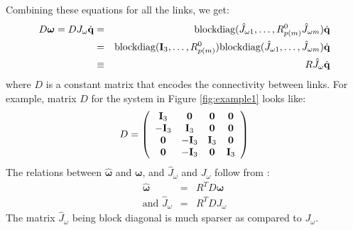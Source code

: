 Combining these equations for all the links, we get:
\begin{eqnarray}
\label{eq:jacsplit}
\nonumber
D \bm{\omega} = D J_{\omega} \dot{\mathbf{q}} & = & \mbox{blockdiag}(\hat{J}_{\omega 1},\hdots,R^0_{p(m)}\hat{J}_{\omega m})\dot{\mathbf{q}}\\
\nonumber
& = & \mbox{blockdiag}(\mathbf{I}_3,\hdots,R^0_{p(m)})\mbox{blockdiag}(\hat{J}_{\omega 1},\hdots,\hat{J}_{\omega m})\dot{\mathbf{q}}\\
& \equiv & R \hat{J}_{\omega}\dot{\mathbf{q}}
\end{eqnarray}
where $D$ is a constant matrix that encodes the connectivity between links. For example, matrix $D$ for the system in Figure \ref{fig:example1} looks
like:
\begin{equation}
D =
\left (
\begin{array}{cccc}
\mathbf{I}_{3}  & \mathbf{0} & \mathbf{0} & \mathbf{0}\\
-\mathbf{I}_{3} & \mathbf{I}_{3}  & \mathbf{0} & \mathbf{0}\\
\mathbf{0} & -\mathbf{I}_{3} & \mathbf{I}_{3}  & \mathbf{0}\\
\mathbf{0} & -\mathbf{I}_{3} & \mathbf{0} & \mathbf{I}_{3}\\
\end{array}
\right )  
\end{equation}
The relations between $\hat{\bm{\omega}}$ and $\bm{\omega}$, and $\hat{J}_{\omega}$ and $J_{\omega}$ follow from :
\begin{eqnarray}
\label{eq:jacbodyhat}
\nonumber
\hat{\bm{\omega}} & = &R^T D \bm{\omega}\\
\mbox{and } \hat{J}_{\omega} & = & R^T D J_{\omega}
\end{eqnarray}
The matrix $\hat{J}_{\omega}$ being block diagonal is much sparser as compared to ${J}_{\omega}$. 


